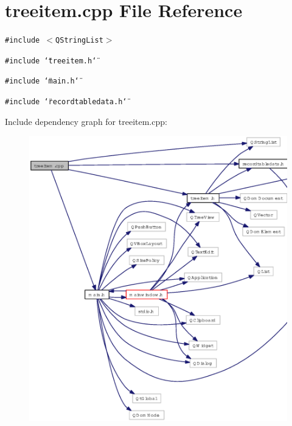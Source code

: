 \section{treeitem.cpp File Reference}
\label{treeitem_8cpp}
{\tt \#include $<$QString\-List$>$}\par
{\tt \#include \char`\"{}treeitem.h\char`\"{}}\par
{\tt \#include \char`\"{}main.h\char`\"{}}\par
{\tt \#include \char`\"{}recordtabledata.h\char`\"{}}\par


Include dependency graph for treeitem.cpp:\begin{figure}[H]
\begin{center}
\leavevmode
\includegraphics[width=350pt]{treeitem_8cpp__incl}
\end{center}
\end{figure}
